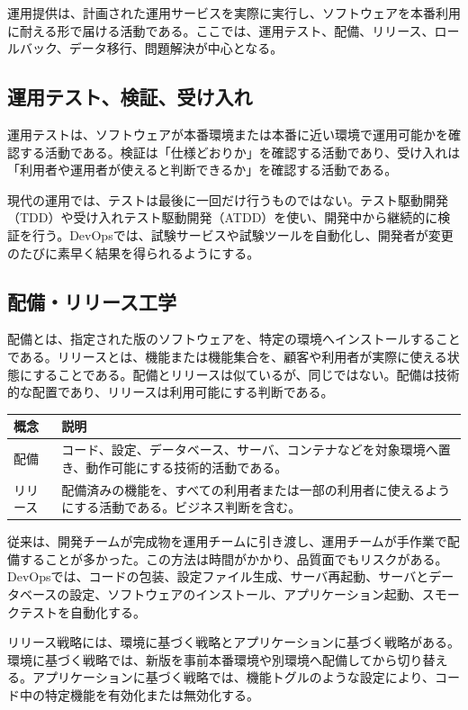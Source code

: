 \documentclass[uplatex,dvipdfmx,a4paper,10pt]{jsarticle}
\begin{document}
運用提供は、計画された運用サービスを実際に実行し、ソフトウェアを本番利用に耐える形で届ける活動である。ここでは、運用テスト、配備、リリース、ロールバック、データ移行、問題解決が中心となる。

\subsection{運用テスト、検証、受け入れ}

運用テストは、ソフトウェアが本番環境または本番に近い環境で運用可能かを確認する活動である。検証は「仕様どおりか」を確認する活動であり、受け入れは「利用者や運用者が使えると判断できるか」を確認する活動である。

現代の運用では、テストは最後に一回だけ行うものではない。テスト駆動開発（TDD）や受け入れテスト駆動開発（ATDD）を使い、開発中から継続的に検証を行う。DevOpsでは、試験サービスや試験ツールを自動化し、開発者が変更のたびに素早く結果を得られるようにする。

\subsection{配備・リリース工学}

配備とは、指定された版のソフトウェアを、特定の環境へインストールすることである。リリースとは、機能または機能集合を、顧客や利用者が実際に使える状態にすることである。配備とリリースは似ているが、同じではない。配備は技術的な配置であり、リリースは利用可能にする判断である。

\begin{longtable}{L{35mm}L{115mm}}
\toprule
概念 & 説明 \\
\midrule
配備 & コード、設定、データベース、サーバ、コンテナなどを対象環境へ置き、動作可能にする技術的活動である。 \\
リリース & 配備済みの機能を、すべての利用者または一部の利用者に使えるようにする活動である。ビジネス判断を含む。 \\
\bottomrule
\end{longtable}

従来は、開発チームが完成物を運用チームに引き渡し、運用チームが手作業で配備することが多かった。この方法は時間がかかり、品質面でもリスクがある。DevOpsでは、コードの包装、設定ファイル生成、サーバ再起動、サーバとデータベースの設定、ソフトウェアのインストール、アプリケーション起動、スモークテストを自動化する。

リリース戦略には、環境に基づく戦略とアプリケーションに基づく戦略がある。環境に基づく戦略では、新版を事前本番環境や別環境へ配備してから切り替える。アプリケーションに基づく戦略では、機能トグルのような設定により、コード中の特定機能を有効化または無効化する。
\end{document}
